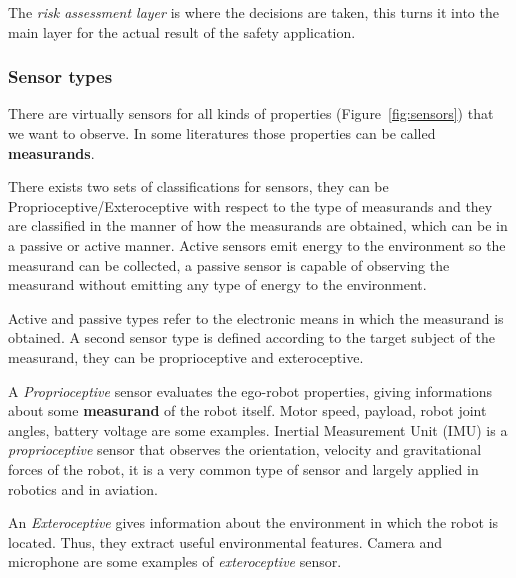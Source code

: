 The \textit{risk assessment layer} is where the decisions are taken, this turns it into the main layer for the actual result of the safety application.

\subsubsection{Sensor types}

There are virtually sensors for all kinds of properties (Figure~\ref{fig:sensors}) that we want to observe. In some literatures those properties can be called \textbf{measurands}\cite{riener2010sensor}. 

There exists two sets of classifications for sensors, they can be Proprioceptive/Exteroceptive with respect to the type of measurands \cite{iyengar1991autonomous} and they are classified in the manner of how the measurands are obtained, which can be in a passive or active \cite{Hebert_2000_3595} manner. Active sensors emit energy to the environment so the measurand can be collected, a passive sensor is capable of observing the measurand without emitting any type of energy to the environment.

Active and passive types refer to the electronic means in which the measurand is obtained. A second sensor type is defined according to the target subject of the measurand, they can be proprioceptive and exteroceptive.

A \textit{Proprioceptive} sensor evaluates the ego-robot properties, giving informations about some \textbf{measurand} of the robot itself. Motor speed, payload, robot joint angles, battery voltage are some examples.  Inertial Measurement Unit (IMU) is a \textit{proprioceptive} sensor that observes the orientation, velocity and gravitational forces of the robot, it is a very common type of sensor and largely applied in robotics and in aviation.

An \textit{Exteroceptive} gives information about the environment in which the robot is located. Thus, they extract useful environmental features. Camera and microphone are some examples of \textit{exteroceptive} sensor.

